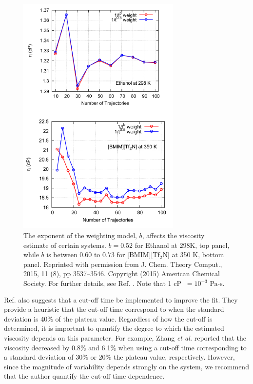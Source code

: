 \documentclass[9pt,bestpractices]{livecoms}
\begin{document}


\begin{figure}[htb!]
	\centering
	\includegraphics[width=3.2in]{ZhangFig7_12.png}
	\caption{The exponent of the weighting model, $b$, affects the viscosity estimate of certain systems. $b = 0.52$ for Ethanol at 298K, top panel, while $b$ is between $0.60$ to $0.73$ for [BMIM][Tf$_2$N] at 350 K, bottom panel. Reprinted with permission from J. Chem. Theory Comput., 2015, 11 (8), pp 3537–3546. Copyright (2015) American Chemical Society. For further details, see Ref. \cite{Zhang2015}. Note that 1 cP $\ = 10^{-3}$ Pa-s.}
	\label{fig:ZhangFig7_12}
\end{figure}

Ref. \cite{Zhang2015} also suggests that a cut-off time be implemented to improve the fit. They provide a heuristic that the cut-off time correspond to when the standard deviation is 40\% of the plateau value. Regardless of how the cut-off is determined, it is important to quantify the degree to which the estimated viscosity depends on this parameter. For example, Zhang \textit{et al.} reported that the viscosity decreased by 0.8\% and 6.1\% when using a cut-off time corresponding to a standard deviation of 30\% or 20\% the plateau value, respectively. However, since the magnitude of variability depends strongly on the system, we recommend that the author quantify the cut-off time dependence.
\end{document}
